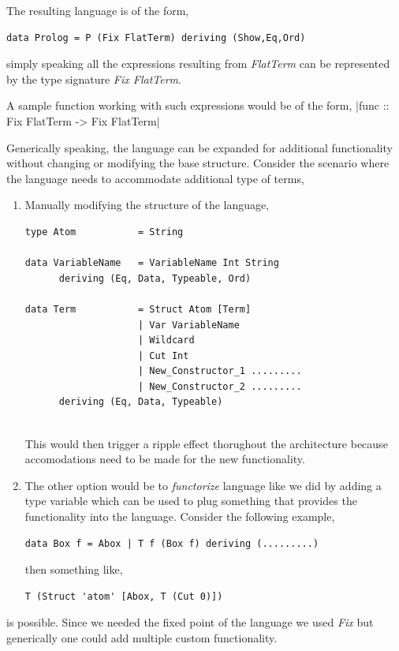 \documentclass[thesis-solanki.tex]{subfiles}
\begin{document}
The resulting language is of the form,
\begin{verbatim}
data Prolog = P (Fix FlatTerm) deriving (Show,Eq,Ord)
\end{verbatim}

simply speaking all the expressions resulting from \textit{FlatTerm} can be represented  by the type signature \textit{Fix FlatTerm}. 

A sample function working with such expressions would be of the form,
|func :: Fix FlatTerm -> Fix FlatTerm|


Generically speaking, the language can be expanded for additional functionality without changing or modifying the base structure. Consider
the scenario where the language needs to accommodate additional type of terms,

\begin{enumerate}
\item Manually modifying the structure of the language,
\begin{verbatim}
type Atom         	= String

data VariableName 	= VariableName Int String
      deriving (Eq, Data, Typeable, Ord)

data Term 			= Struct Atom [Term]
          			| Var VariableName
          			| Wildcard  
          			| Cut Int
          			| New_Constructor_1 .........
          			| New_Constructor_2 .........
      deriving (Eq, Data, Typeable)
      
\end{verbatim}

This would then trigger a ripple effect thorughout the architecture because accomodations need to be made for the new functionality.

\item The other option would be to \textit{functorize} language like we did by adding a type variable which can be used to plug something that provides the functionality into the language.
Consider the following example,

\begin{verbatim}
data Box f = Abox | T f (Box f) deriving (.........)
\end{verbatim}

then something like,
\begin{verbatim}
T (Struct 'atom' [Abox, T (Cut 0)])
\end{verbatim}
\end{enumerate}
is possible. Since we needed the fixed point of the language we used \textit{Fix} but generically one could add multiple custom 
functionality.
 
\end{document}
